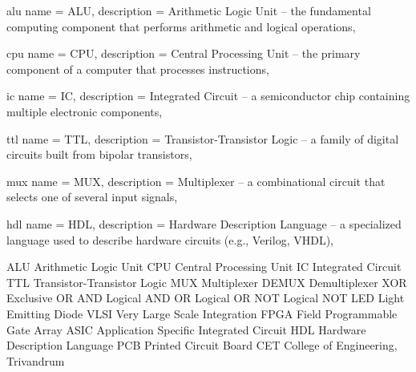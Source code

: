 \newglossaryentry
    {alu}
    {
        name        = {ALU},
        description = {Arithmetic Logic Unit -- the fundamental computing component that performs arithmetic and logical operations},
    }

\newglossaryentry
    {cpu}
    {
        name        = {CPU},
        description = {Central Processing Unit -- the primary component of a computer that processes instructions},
    }

\newglossaryentry
    {ic}
    {
        name        = {IC},
        description = {Integrated Circuit -- a semiconductor chip containing multiple electronic components},
    }

\newglossaryentry
    {ttl}
    {
        name        = {TTL},
        description = {Transistor-Transistor Logic -- a family of digital circuits built from bipolar transistors},
    }

\newglossaryentry
    {mux}
    {
        name        = {MUX},
        description = {Multiplexer -- a combinational circuit that selects one of several input signals},
    }

\newglossaryentry
    {hdl}
    {
        name        = {HDL},
        description = {Hardware Description Language -- a specialized language used to describe hardware circuits (e.g., Verilog, VHDL)},
    }

   {ALU}      {Arithmetic Logic Unit}
   {CPU}      {Central Processing Unit}
    {IC}       {Integrated Circuit}
   {TTL}      {Transistor-Transistor Logic}
   {MUX}      {Multiplexer}
 {DEMUX}    {Demultiplexer}
   {XOR}      {Exclusive OR}
   {AND}      {Logical AND}
    {OR}       {Logical OR}
   {NOT}      {Logical NOT}
   {LED}      {Light Emitting Diode}
  {VLSI}     {Very Large Scale Integration}
  {FPGA}     {Field Programmable Gate Array}
  {ASIC}     {Application Specific Integrated Circuit}
   {HDL}      {Hardware Description Language}
   {PCB}      {Printed Circuit Board}
   {CET}      {College of Engineering, Trivandrum}
